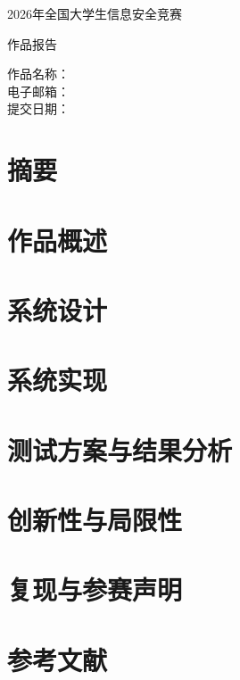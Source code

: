 \documentclass[12pt,a4paper,UTF8]{ctexrep}
\newif\ifincludeappendix
\renewcommand{\thesection}{\arabic{chapter}.\arabic{section}}
\begin{document}
\songti

\begin{titlepage}
\centering
{\heiti{} 2026年全国大学生信息安全竞赛\par}
\vspace{1.2cm}
{\heiti{} 作品报告\par}
\vspace{2.4cm}
\begin{flushleft}
作品名称：\\[0.8cm]
电子邮箱：\\[0.8cm]
提交日期：\\[0.8cm]
\end{flushleft}
\vfill
\end{titlepage}

\tableofcontents
\clearpage

\chapter*{摘要}


\chapter{作品概述}


\chapter{系统设计}


\chapter{系统实现}


\chapter{测试方案与结果分析}


\chapter{创新性与局限性}


\chapter{复现与参赛声明}


\chapter*{参考文献}


\ifincludeappendix
  \appendix
  \renewcommand{\thesection}{\Alph{chapter}.\arabic{section}}
  \chapter{关键代码实现}
  
\fi
\end{document}
